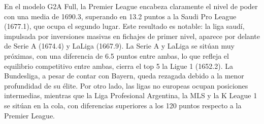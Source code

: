 En el modelo G2A Full, la Premier League encabeza claramente el nivel de poder con una media de 1690.3, superando en 13.2 puntos a la Saudi Pro League (1677.1), que ocupa el segundo lugar. Este resultado es notable: la liga saud\'i, impulsada por inversiones masivas en fichajes de primer nivel, aparece por delante de Serie A (1674.4) y LaLiga (1667.9). La Serie A y LaLiga se sit\'uan muy pr\'oximas, con una diferencia de 6.5 puntos entre ambas, lo que refleja el equilibrio competitivo entre ambas, cierra el top 5 la Ligue 1 (1652.2). La Bundesliga, a pesar de contar con Bayern, queda rezagada debido a la menor profundidad de su \'elite. Por otro lado, las ligas no europeas ocupan posiciones intermedias, mientras que la Liga Profesional Argentina, la MLS y la K League 1 se sit\'uan en la cola, con diferencias superiores a los 120 puntos respecto a la Premier League.

